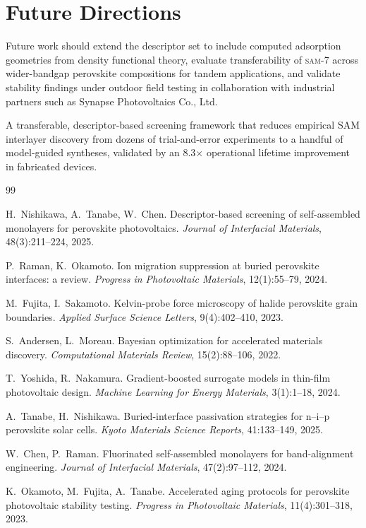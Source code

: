 \section{Future Directions}

Future work should extend the descriptor set to include computed
adsorption geometries from density functional theory, evaluate
transferability of \textsc{sam-7} across wider-bandgap perovskite
compositions for tandem applications, and validate stability findings
under outdoor field testing in collaboration with industrial partners
such as Synapse Photovoltaics Co., Ltd.

\begin{keybox}[title=Key Contribution]
A transferable, descriptor-based screening framework that reduces
empirical SAM interlayer discovery from dozens of trial-and-error
experiments to a handful of model-guided syntheses, validated by an
8.3$\times$ operational lifetime improvement in fabricated devices.
\end{keybox}

\begin{thebibliography}{99}

 H.\ Nishikawa, A.\ Tanabe, W.\ Chen. Descriptor-based
  screening of self-assembled monolayers for perovskite photovoltaics.
  \textit{Journal of Interfacial Materials}, 48(3):211--224, 2025.

 P.\ Raman, K.\ Okamoto. Ion migration suppression at
  buried perovskite interfaces: a review. \textit{Progress in
  Photovoltaic Materials}, 12(1):55--79, 2024.

 M.\ Fujita, I.\ Sakamoto. Kelvin-probe force microscopy of
  halide perovskite grain boundaries. \textit{Applied Surface Science
  Letters}, 9(4):402--410, 2023.

 S.\ Andersen, L.\ Moreau. Bayesian optimization for
  accelerated materials discovery. \textit{Computational Materials
  Review}, 15(2):88--106, 2022.

 T.\ Yoshida, R.\ Nakamura. Gradient-boosted surrogate
  models in thin-film photovoltaic design. \textit{Machine Learning for
  Energy Materials}, 3(1):1--18, 2024.

 A.\ Tanabe, H.\ Nishikawa. Buried-interface passivation
  strategies for n--i--p perovskite solar cells. \textit{Kyoto Materials
  Science Reports}, 41:133--149, 2025.

 W.\ Chen, P.\ Raman. Fluorinated self-assembled
  monolayers for band-alignment engineering. \textit{Journal of
  Interfacial Materials}, 47(2):97--112, 2024.

 K.\ Okamoto, M.\ Fujita, A.\ Tanabe. Accelerated aging
  protocols for perovskite photovoltaic stability testing.
  \textit{Progress in Photovoltaic Materials}, 11(4):301--318, 2023.

\end{thebibliography}

\appendix

